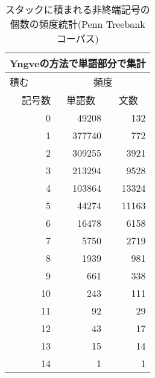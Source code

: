 \begin{table}[t]
\vspace{-3mm}
  \caption{スタックに積まれる非終端記号の個数の頻度統計(Penn Treebank コーパス)}
  \label{tab:hindo_toukei_eng}
  \begin{center}
\small\small\renewcommand{\arraystretch}{}
\begin{tabular}[t]{|r|r|r|}
\multicolumn{3}{c}{Yngveの方法で単語部分で集計}\\\hline
\multicolumn{1}{|l|}{積む} & \multicolumn{2}{c|}{頻度}\\\cline{2-3}
記号数    &   \multicolumn{1}{c|}{単語数} & \multicolumn{1}{c|}{文数}\\\hline
0 & 49208 & 132\\
1 & 377740 & 772\\
2 & 309255 & 3921\\
3 & 213294 & 9528\\
4 & 103864 & 13324\\
5 & 44274 & 11163\\
6 & 16478 & 6158\\
7 & 5750 & 2719\\
8 & 1939 & 981\\
9 & 661 & 338\\
10 & 243 & 111\\
11 & 92 & 29\\
12 & 43 & 17\\
13 & 15 & 14\\
14 & 1 & 1\\\hline
\end{tabular}
\end{center}
\end{table}

